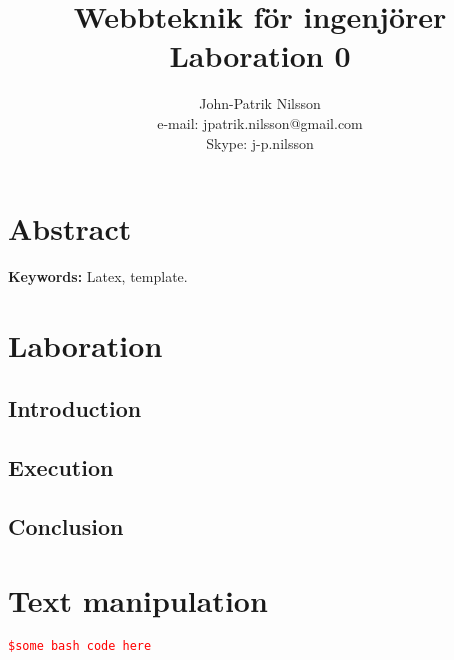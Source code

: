 \documentclass[a4paper,10pt]{article}
\title{Webbteknik för ingenjörer \\
	Laboration 0}
\author{John-Patrik Nilsson \\
	e-mail: jpatrik.nilsson@gmail.com \\
	Skype: j-p.nilsson}
\begin{document}
\maketitle

\pagestyle{empty}
\thispagestyle{empty}

\section{Abstract}

\textbf{Keywords:} Latex, template.

\section{Laboration}
\subsection{Introduction}

\subsection{Execution}

\subsection{Conclusion}

\appendix
\section{Text manipulation}
\textcolor{red}{\texttt{\$some bash code here}}
\end{document}
